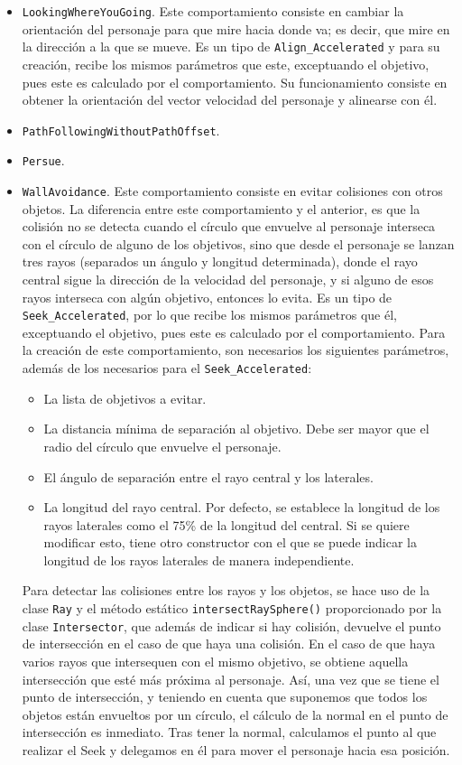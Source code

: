 \begin{itemize}
 
 \item \texttt{LookingWhereYouGoing}. Este comportamiento consiste en cambiar la orientación del personaje para que mire hacia donde va; es decir, que mire en la dirección a la que se mueve. Es un tipo de \texttt{Align\_Accelerated} y para su creación, recibe los mismos parámetros que este, exceptuando el objetivo, pues este es calculado por el comportamiento. Su funcionamiento consiste en obtener la orientación del vector velocidad del personaje y alinearse con él.
 
 \item \texttt{PathFollowingWithoutPathOffset}.
 \item \texttt{Persue}.
 
 
 \item \texttt{WallAvoidance}. Este comportamiento consiste en evitar colisiones con otros objetos. La diferencia entre este comportamiento y el anterior, es que la colisión no se detecta cuando el círculo que envuelve al personaje interseca con el círculo de alguno de los objetivos, sino que desde el personaje se lanzan tres rayos (separados un ángulo y longitud determinada), donde el rayo central sigue la dirección de la velocidad del personaje, y si alguno de esos rayos interseca con algún objetivo, entonces lo evita. Es un tipo de \texttt{Seek\_Accelerated}, por lo que recibe los mismos parámetros que él, exceptuando el objetivo, pues este es calculado por el comportamiento. Para la creación de este comportamiento, son necesarios los siguientes parámetros, además de los necesarios para el \texttt{Seek\_Accelerated}:
 \begin{itemize}
  \item La lista de objetivos a evitar.
  \item La distancia mínima de separación al objetivo. Debe ser mayor que el radio del círculo que envuelve el personaje.
  \item El ángulo de separación entre el rayo central y los laterales.
  \item La longitud del rayo central. Por defecto, se establece la longitud de los rayos laterales como el 75\% de la longitud del central. Si se quiere modificar esto, tiene otro constructor con el que se puede indicar la longitud de los rayos laterales de manera independiente.
 \end{itemize}
 Para detectar las colisiones entre los rayos y los objetos, se hace uso de la clase \texttt{Ray} y el método estático \texttt{intersectRaySphere()} proporcionado por la clase \texttt{Intersector}, que además de indicar si hay colisión, devuelve el punto de intersección en el caso de que haya una colisión. En el caso de que haya varios rayos que intersequen con el mismo objetivo, se obtiene aquella intersección que esté más próxima al personaje. Así, una vez que se tiene el punto de intersección, y teniendo en cuenta que suponemos que todos los objetos están envueltos por un círculo, el cálculo de la normal en el punto de intersección es inmediato. Tras tener la normal, calculamos el punto al que realizar el Seek y delegamos en él para mover el personaje hacia esa posición.
 

\end{itemize}
